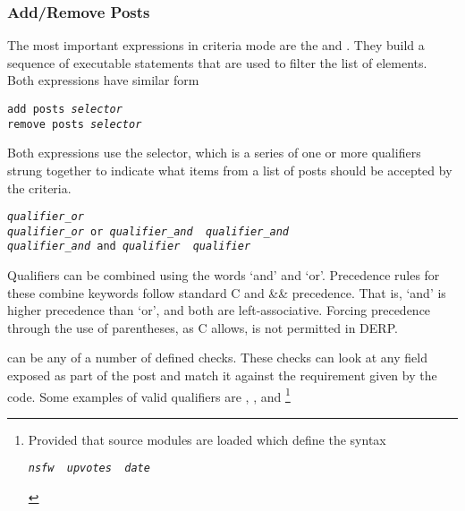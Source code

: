 \subsubsection{Add/Remove Posts}
The most important expressions in criteria mode are the  and . They build a sequence of
executable statements that are used to filter the list of elements. Both expressions have similar form
\begin{description}[labelindent=1cm,leftmargin=\onelen,labelwidth=1cm]
      \texttt{add posts \textit{selector}}\\
      \texttt{remove posts \textit{selector}}\\
\end{description}
Both expressions use the selector, which is a series of one or more qualifiers strung together to indicate what
items from a list of posts should be accepted by the criteria.\\
\begin{description}[labelindent=1cm,leftmargin=\onelen,labelwidth=1cm]
     \texttt{\textit{qualifier\_or}}\\
      \texttt{\textit{qualifier\_or} or \textit{qualifier\_and} \textbf{\textbar} \textit{qualifier\_and}}\\
      \texttt{\textit{qualifier\_and} and \textit{qualifier} \textbf{\textbar} \textit{qualifier}}\\
\end{description}
Qualifiers can be combined using the words ‘and’ and ‘or’. Precedence rules for these combine keywords follow standard
C \textbar\textbar and \&\& precedence. That is, ‘and’ is higher precedence than ‘or’, and both are left-associative. Forcing precedence
through the use of parentheses, as C allows, is not permitted in DERP.

 can be any of a number of defined checks. These checks can look at any field exposed as part of the post and
match it against the requirement given by the code. Some examples of valid qualifiers are ,
, and \footnote{Provided that source modules are loaded which define the syntax\\
\begin{description}[labelindent=1cm,leftmargin=\onelen,labelwidth=1cm]
  \texttt{\textit{nsfw} \textbf{\textbar} \textit{upvotes} \textbf{\textbar} \textit{date}}
\end{description}}

